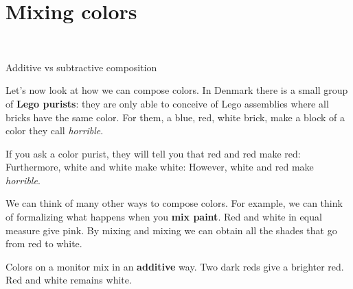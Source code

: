 
\section{Mixing colors}

\begin{marginfigure}
    \centering
    \\
    \caption{Additive vs subtractive composition}
\end{marginfigure}

Let's now look at how we can compose colors.
In Denmark there is a small group of \textbf{Lego purists}: they are only able to conceive of Lego assemblies where all bricks have the same color.
For them, a blue, red, white brick, make a block of a color they call \emph{horrible}.


If you ask a color purist, they will tell you that red and red make red:
%
%
Furthermore, white and white make white:
%
%
However, white and red make \emph{horrible}.
%



We can think of many other ways to compose colors.
For example, we can think of formalizing what happens when you \textbf{mix paint}.
Red and white in equal measure give pink.
By mixing and mixing we can obtain all the shades that go from red to white.


Colors on a monitor mix in an \textbf{additive} way.
Two dark reds give a brighter red.
Red and white remains white.


